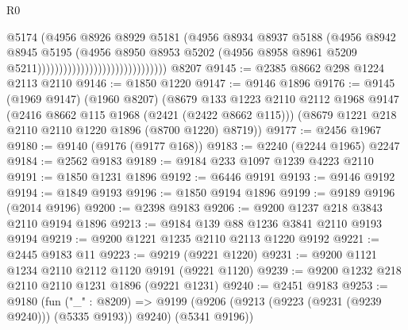 \begin{lexlean}{R0}
\begin{coremodule}
                                                      @5174
                                                      (@4956
                                                        @8926
                                                        @8929
                                                        @5181
                                                        (@4956
                                                          @8934
                                                          @8937
                                                          @5188
                                                          (@4956
                                                            @8942
                                                            @8945
                                                            @5195
                                                            (@4956
                                                              @8950
                                                              @8953
                                                              @5202
                                                              (@4956
                                                                @8958
                                                                @8961
                                                                @5209
                                                                @5211))))))))))))))))))))))))))))))
    @8207
@9145 := @2385 @8662 @298 @1224 @2113 @2110
@9146 := @1850 @1220
@9147 := @9146 @1896
@9176 := @9145
    (@1969 @9147)
    (@1960 @8207)
    (@8679
      @133
      @1223
      @2110
      @2112
      @1968
      @9147
      (@2416 @8662 @115 @1968 (@2421 (@2422 @8662 @115)))
      (@8679 @1221 @218 @2110 @2110 @1220 @1896 (@8700 @1220) @8719))
@9177 := @2456 @1967
@9180 := @9140 (@9176 (@9177 @168))
@9183 := @2240 (@2244 @1965) @2247
@9184 := @2562 @9183
@9189 := @9184 @233 @1097 @1239 @4223 @2110
@9191 := @1850 @1231 @1896
@9192 := @6446 @9191
@9193 := @9146 @9192
@9194 := @1849 @9193
@9196 := @1850 @9194 @1896
@9199 := @9189 @9196 (@2014 @9196)
@9200 := @2398 @9183
@9206 := @9200 @1237 @218 @3843 @2110 @9194 @1896
@9213 := @9184 @139 @88 @1236 @3841 @2110 @9193 @9194
@9219 := @9200 @1221 @1235 @2110 @2113 @1220 @9192
@9221 := @2445 @9183 @11
@9223 := @9219 (@9221 @1220)
@9231 := @9200 @1121 @1234 @2110 @2112 @1120 @9191 (@9221 @1120)
@9239 := @9200 @1232 @218 @2110 @2110 @1231 @1896 (@9221 @1231)
@9240 := @2451 @9183
@9253 := @9180
    (fun ("_" : @8209) =>
    @9199 (@9206 (@9213 (@9223 (@9231 (@9239 @9240))) (@5335 @9193)) @9240) (@5341 @9196))

\end{coremodule}
\end{lexlean}
